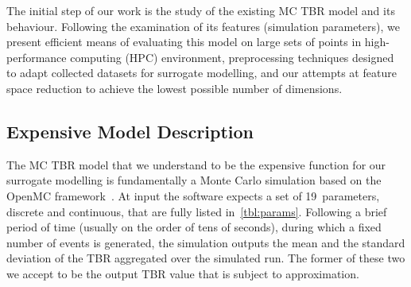 The initial step of our work is the study of the existing MC TBR model and its
behaviour. Following the examination of its features (simulation parameters), we
present efficient means of evaluating this model on large sets of points in
high-performance computing (HPC) environment, preprocessing techniques designed
to adapt collected datasets for surrogate modelling, and our attempts at feature
space reduction to achieve the lowest possible number of dimensions.


\subsection{Expensive Model Description}
\label{sec:expensive-model-description}

The MC TBR model that we understand to be the expensive function for our
surrogate modelling is fundamentally a Monte Carlo simulation based on the
OpenMC framework~\cite{ROMANO201590}. At input the software expects a set of 19~parameters, discrete and
continuous, that are fully listed in~\cref{tbl:params}. Following a brief period of
time (usually on the order of tens of seconds), during which a fixed number of
events is generated, the simulation outputs the
mean and the standard deviation of the TBR aggregated over the simulated run. The
former of these two we accept to be the output TBR value that is subject
to approximation.

